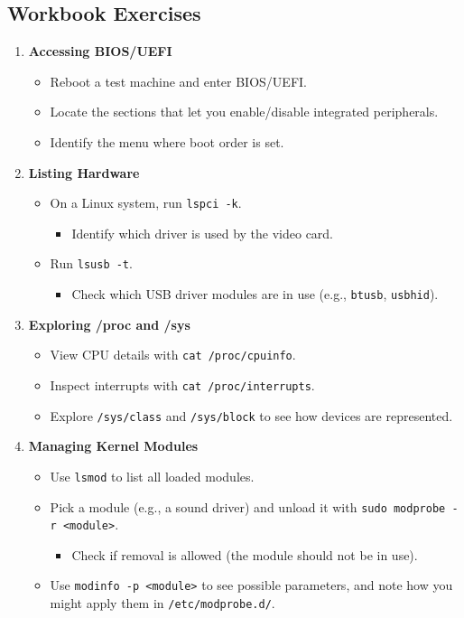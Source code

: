 \documentclass[12pt,a4paper]{report}
\begin{document}
\subsection*{Workbook Exercises}
\begin{enumerate}
    \item \textbf{Accessing BIOS/UEFI}
    \begin{itemize}
        \item Reboot a test machine and enter BIOS/UEFI.
        \item Locate the sections that let you enable/disable integrated peripherals.
        \item Identify the menu where boot order is set.
    \end{itemize}

    \item \textbf{Listing Hardware}
    \begin{itemize}
        \item On a Linux system, run \texttt{lspci -k}.
        \begin{itemize}
          \item Identify which driver is used by the video card.
        \end{itemize}
        \item Run \texttt{lsusb -t}.
        \begin{itemize}
          \item Check which USB driver modules are in use (e.g., \texttt{btusb}, \texttt{usbhid}).
        \end{itemize}
    \end{itemize}

    \item \textbf{Exploring /proc and /sys}
    \begin{itemize}
        \item View CPU details with \texttt{cat /proc/cpuinfo}.
        \item Inspect interrupts with \texttt{cat /proc/interrupts}.
        \item Explore \texttt{/sys/class} and \texttt{/sys/block} to see how devices are represented.
    \end{itemize}

    \item \textbf{Managing Kernel Modules}
    \begin{itemize}
        \item Use \texttt{lsmod} to list all loaded modules.
        \item Pick a module (e.g., a sound driver) and unload it with \texttt{sudo modprobe -r <module>}.
        \begin{itemize}
          \item Check if removal is allowed (the module should not be in use).
        \end{itemize}
        \item Use \texttt{modinfo -p <module>} to see possible parameters, and note how you might apply them in \texttt{/etc/modprobe.d/}.
    \end{itemize}


\end{enumerate}
\end{document}
